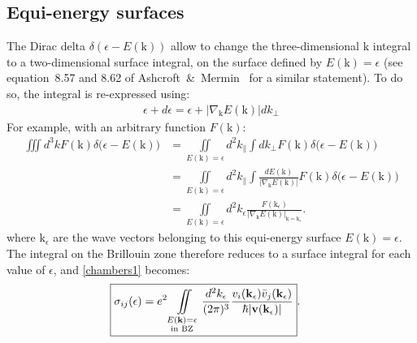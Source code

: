 \documentclass[notitlepage,11pt,nofootinbib]{revtex4-1}
\renewcommand{\vec}[1]{\bm{\mathrm{#1}}}
\begin{document}
\subsection{Equi-energy surfaces}\label{sec_surfaces}
The Dirac delta $\delta(\epsilon-E(\vec k))$ allow to change the three-dimensional $\vec k$ integral to a two-dimensional surface integral, on the surface defined by $E(\vec k)=\epsilon$ (see equation~8.57 and 8.62 of Ashcroft~\&~Mermin~\cite{ashcroft_solid_1976} for a similar statement). To do so, the integral is re-expressed using:
\begin{align}
\epsilon + d\epsilon = \epsilon + |\nabla_{\vec k}E(\vec k)|dk_{\perp}
\end{align}
For example, with an arbitrary function $F(\vec k)$:
\begin{align}
\iiint d^3 k 
F(\vec k)\delta\big(\epsilon - E(\vec k)\big)
&=
\iint\limits_{E(\vec k)=\epsilon} d^2k_{\parallel}
\int dk_{\perp}
F(\vec k)\delta\big(\epsilon - E(\vec k)\big)
\\
&=
\iint\limits_{E(\vec k)=\epsilon} d^2k_{\parallel} 
\int \frac{dE(\vec k)}{|\nabla_{\vec k}E(\vec k)|}
F(\vec k)\delta\big(\epsilon - E(\vec k)\big)
\\
&=
\iint\limits_{E(\vec k)=\epsilon} d^2k_{\epsilon} 
\frac{F(\vec k_{\epsilon})}{|\nabla_{\vec k}E(\vec k)|_{\vec k=\vec k_{\epsilon}}}.
\end{align}
where $\vec k_{\epsilon}$ are the wave vectors belonging to this equi-energy surface $E(\vec k)=\epsilon$. The integral on the Brillouin zone therefore reduces to a surface integral for each value of $\epsilon$, and \eqref{chambers1} becomes:
\begin{align}
\Aboxed{
\sigma_{ij}(\epsilon) 
&=
e^2
\iint\limits_{\substack{E(\vec k)=\epsilon\\ \text{in BZ}}}
\frac{d^2k_{\epsilon}}{(2\pi)^3}
\frac{v_{i}(\vec k_{\epsilon})\bar{v}_{j}(\vec k_{\epsilon})}{\hbar|\vec v(\vec k_{\epsilon})|}
}.
\label{chambersSurfaces}
\end{align}
\end{document}
